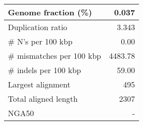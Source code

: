 \documentclass[12pt,a4paper]{article}
\begin{document}
\begin{table}[ht]
\begin{center}
\begin{tabular}{|l*{1}{|r}|}
Genome fraction (\%) & 0.037 \\ \hline
Duplication ratio & 3.343 \\ \hline
\# N's per 100 kbp & 0.00 \\ \hline
\# mismatches per 100 kbp & 4483.78 \\ \hline
\# indels per 100 kbp & 59.00 \\ \hline
Largest alignment & 495 \\ \hline
Total aligned length & 2307 \\ \hline
NGA50 & - \\ \hline
\end{tabular}
\end{center}
\end{table}
\end{document}

